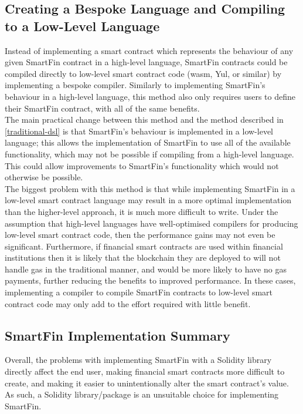 \subsection{Creating a Bespoke Language and Compiling to a Low-Level Language}

Instead of implementing a smart contract which represents the behaviour of any given SmartFin contract in a high-level language, SmartFin contracts could be compiled directly to low-level smart contract code (wasm, Yul\cite{yul}, or similar) by implementing a bespoke compiler. Similarly to implementing SmartFin's behaviour in a high-level language, this method also only requires users to define their SmartFin contract, with all of the same benefits. \\

The main practical change between this method and the method described in \ref{traditional-dsl} is that Smart\-Fin's behaviour is implemented in a low-level language; this allows the implementation of SmartFin to use all of the available functionality, which may not be possible if compiling from a high-level language. This could allow improvements to SmartFin's functionality which would not otherwise be possible. \\

The biggest problem with this method is that while implementing SmartFin in a low-level smart contract language may result in a more optimal implementation than the higher-level approach, it is much more difficult to write. Under the assumption that high-level languages have well-optimised compilers for producing low-level smart contract code, then the performance gains may not even be significant. Furthermore, if financial smart contracts are used within financial institutions then it is likely that the blockchain they are deployed to will not handle gas in the traditional manner, and would be more likely to have no gas payments, further reducing the benefits to improved performance. In these cases, implementing a compiler to compile SmartFin contracts to low-level smart contract code may only add to the effort required with little benefit.


\subsection{SmartFin Implementation Summary}

Overall, the problems with implementing SmartFin with a Solidity library directly affect the end user, making financial smart contracts more difficult to create, and making it easier to unintentionally alter the smart contract's value. As such, a Solidity library/package is an unsuitable choice for implementing SmartFin. \\

